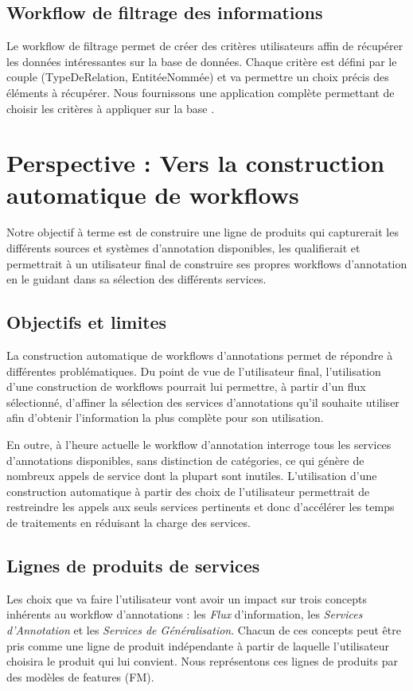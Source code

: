 \documentclass[]{easychair}
\newcommand{\comment}[4]{\par\noindent\hspace*{-0.5cm}{\parbox{\columnwidth}{\textbf{\color{#1}//#2[#3]:#4}}}\par}
\newcommand{\si}[1]{\comment{red}{}{#1}{SI}}
\begin{document}
\subsection{Workflow de filtrage des informations}
Le workflow de filtrage permet de créer des critères utilisateurs affin de récupérer les données intéressantes sur la base de données. Chaque critère est défini par le couple (TypeDeRelation, EntitéeNommée) et va permettre un choix précis des éléments à récupérer. Nous fournissons une application complète permettant de choisir les critères à appliquer sur la base \cite{Christophe}.


\section{Perspective : Vers la construction automatique de workflows }
\label{sect:perspectives}
Notre objectif à terme est de construire une ligne de produits qui capturerait les différents sources et systèmes d'annotation disponibles, les qualifierait et permettrait à un utilisateur final de construire ses propres workflows d'annotation en le guidant dans sa sélection des différents services.

\subsection{Objectifs et limites}

La construction automatique de workflows d'annotations permet de répondre à différentes problématiques. Du point de vue de l'utilisateur final, l'utilisation d'une construction de workflows pourrait lui permettre, à partir d'un flux sélectionné, d'affiner la sélection des services d'annotations qu'il souhaite utiliser afin d'obtenir l'information la plus complète pour son utilisation.

En outre, à l'heure actuelle le workflow d'annotation interroge tous les services d'annotations disponibles, sans distinction de catégories, ce qui génère de nombreux appels de service dont la plupart sont inutiles. L'utilisation d'une construction automatique à partir des choix de l'utilisateur permettrait de restreindre les appels aux seuls services pertinents et donc d'accélérer les temps de traitements en réduisant la charge des services. 

\subsection{Lignes de produits de services}
Les choix que va faire l'utilisateur vont avoir un impact sur trois concepts inhérents au workflow d'annotations : les \textit{Flux} d'information, les \textit{Services d'Annotation} et les \textit{Services de Généralisation}. Chacun de ces concepts peut être pris comme une ligne de produit indépendante à partir de laquelle l'utilisateur choisira le produit qui lui convient. Nous représentons ces lignes de produits par des modèles de features (FM).
\si{Réf FM / SPL - Expliquer choix de la SPL ?}
\end{document}
